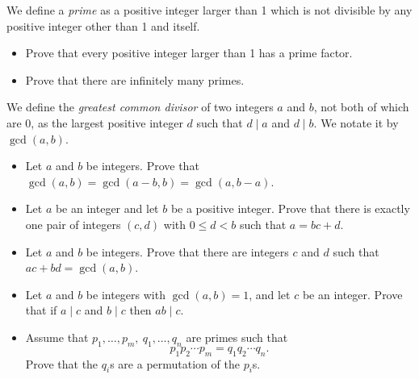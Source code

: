 \documentclass{article}
\begin{document}
  We define a \emph{prime} as a positive integer larger than 1 which is not
  divisible by any positive integer other than 1 and itself.
  \begin{itemize}
    \item Prove that every positive integer larger than 1 has a prime factor.
    \item Prove that there are infinitely many primes.
  \end{itemize}

  We define the \emph{greatest common divisor} of two integers $a$ and $b$, not
  both of which are 0, as the largest positive integer $d$ such that $d\mid a$
  and $d\mid b$. We notate it by $\gcd(a,b)$.
  \begin{itemize}
    \item Let $a$ and $b$ be integers. Prove that $\gcd(a,b)=\gcd(a-b,b)=
      \gcd(a,b-a)$.
    \item Let $a$ be an integer and let $b$ be a positive integer. Prove that
      there is exactly one pair of integers $(c,d)$ with $0\le d<b$ such that
      $a=bc+d$.
    \item Let $a$ and $b$ be integers. Prove that there are integers $c$ and $d$
      such that $ac+bd=\gcd(a,b)$.
    \item Let $a$ and $b$ be integers with $\gcd(a,b)=1$, and let $c$ be an
      integer. Prove that if $a\mid c$ and $b\mid c$ then $ab\mid c$.
    \item Assume that $p_1,\ldots,p_m,\ q_1,\ldots,q_n$ are primes such that
      \[p_1p_2\cdots p_m=q_1q_2\cdots q_n.\]
      Prove that the $q_i$s are a permutation of the $p_i$s.
  \end{itemize}
\end{document}
